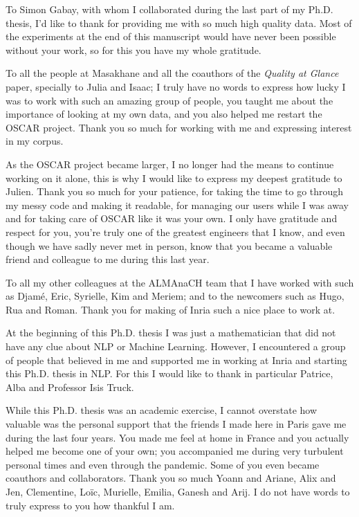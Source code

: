 To Simon Gabay, with whom I collaborated during the last part of my Ph.D. thesis, I'd like to thank for providing me with so much high quality data. Most of the experiments at the end of this manuscript would have never been possible without your work, so for this you have my whole gratitude.

To all the people at Masakhane and all the coauthors of the \emph{Quality at Glance} paper, specially to Julia and Isaac; I truly have no words to express how lucky I was to work with such an amazing group of people, you taught me about the importance of looking at my own data, and you also helped me restart the OSCAR project. Thank you so much for working with me and expressing interest in my corpus.

As the OSCAR project became larger, I no longer had the means to continue working on it alone, this is why I would like to express my deepest gratitude to Julien. Thank you so much for your patience, for taking the time to go through my messy code and making it readable, for managing our users while I was away and for taking care of OSCAR like it was your own. I only have gratitude and respect for you, you're truly one of the greatest engineers that I know, and even though we have sadly never met in person, know that you became a valuable friend and colleague to me during this last year.

To all my other colleagues at the ALMAnaCH team that I have worked with such as Djamé, Eric, Syrielle, Kim and Meriem; and to the newcomers such as Hugo, Rua and Roman. Thank you for making of Inria such a nice place to work at.

At the beginning of this Ph.D. thesis I was just a mathematician that did not have any clue about NLP or Machine Learning. However, I encountered a group of people that believed in me and supported me in working at Inria and starting this Ph.D. thesis in NLP. For this I would like to thank in particular Patrice, Alba and Professor Isis Truck.

While this Ph.D. thesis was an academic exercise, I cannot overstate how valuable was the personal support that the friends I made here in Paris gave me during the last four years. You made me feel at home in France and you actually helped me become one of your own; you accompanied me during very turbulent personal times and even through the pandemic. Some of you even became coauthors and collaborators. Thank you so much Yoann and Ariane, Alix and Jen, Clementine, Loïc, Murielle, Emilia, Ganesh and Arij. I do not have words to truly express to you how thankful I am.

